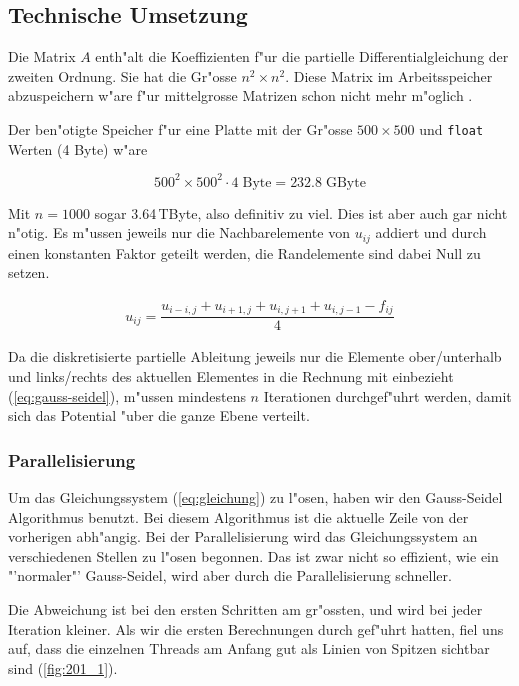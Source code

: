 \begin{refsection}
\subsection{Technische Umsetzung}

Die Matrix $A$ enth"alt die Koeffizienten f"ur die partielle
Differentialgleichung der zweiten Ordnung. Sie hat die Gr"osse $n^2
\times n^2$. Diese Matrix im Arbeitsspeicher abzuspeichern w"are
f"ur mittelgrosse Matrizen schon nicht mehr
m"oglich \cite{mueller:hpcseminar}.
	
Der ben"otigte Speicher f"ur eine Platte mit der Gr"osse $500 \times
500$ und \verb|float| Werten (4 Byte) w"are
	
\begin{equation}
500^2 \times 500^2 \cdot 4\;\mathrm{Byte} = 232.8\;\mathrm{GByte}
\end{equation}
	
Mit $n = 1000$ sogar 3.64\,TByte, also definitiv zu viel. Dies ist
aber auch gar nicht n"otig. Es m"ussen jeweils nur die Nachbarelemente
von $u_{ij}$ addiert und durch einen konstanten Faktor geteilt
werden, die Randelemente sind dabei Null zu setzen.

\begin{eqnarray}
u_{ij} = \dfrac{u_{i-i,j}+u_{i+1,j}+u_{i,j+1}+u_{i,j-1}-f_{ij}}{4}
\label{eq:gauss-seidel}
\end{eqnarray}
	
Da die diskretisierte partielle Ableitung jeweils nur die Elemente
ober/unterhalb und links/rechts des aktuellen Elementes in die
Rechnung mit einbezieht (\ref{eq:gauss-seidel}), m"ussen mindestens
$n$ Iterationen durchgef"uhrt werden, damit sich das Potential "uber
die ganze Ebene verteilt.
	
\subsubsection{Parallelisierung}
	
Um das Gleichungssystem (\ref{eq:gleichung}) zu l"osen, haben wir
den Gauss-Seidel Algorithmus benutzt. Bei diesem Algorithmus ist
die aktuelle Zeile von der vorherigen abh"angig. Bei der Parallelisierung
wird das Gleichungssystem an verschiedenen Stellen zu l"osen begonnen.
Das ist zwar nicht so effizient, wie ein "'normaler"' Gauss-Seidel,
wird aber durch die Parallelisierung schneller.
		
Die Abweichung ist bei den ersten Schritten am gr"ossten, und wird
bei jeder Iteration kleiner. Als wir die ersten Berechnungen durch
gef"uhrt hatten, fiel uns auf, dass die einzelnen Threads am Anfang
gut als Linien von Spitzen sichtbar sind (\ref{fig:201_1}).
		

\end{refsection}
